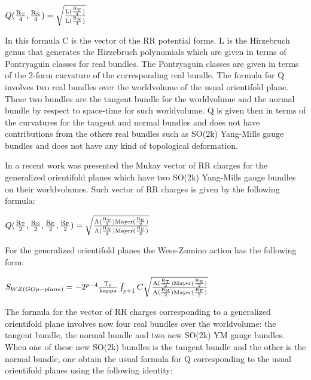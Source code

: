 \documentclass[a4paper,a4paper]{article}
\begin{document}
\begin{center}
{  $ Q(\frac{\rm R_T}{\rm 4},\frac{\rm R_N}{\rm 4}) =\sqrt{\frac{\rm L(\frac{\rm R_T}{\rm 4})}{\rm L(\frac{\rm R_N}{\rm 4})}}  $ }
\end{center}
In this formula C is the vector of the RR potential forms. L is the Hirzebruch genus that generates the Hirzebruch polynomials which are given in
terms of Pontryaguin classes for real bundles. The Pontryaguin classes are given in terms of the 2-form curvature of the corresponding real bundle. The
formula for Q involves two real bundles over the worldvolume of the usual orientifold plane.  These two bundles are the tangent bundle for the worldvolume and the normal bundle by respect to space-time for such worldvolume. Q is given then in terms of the curvatures for the tangent and
normal bundles and does not have contributions  from the others real bundles
such as SO(2k) Yang-Mills gauge bundles and does not have any kind of topological deformation.

In a recent work was presented the Mukay vector of RR charges for the generalized orientifold planes which have two SO(2k) Yang-Mills gauge bundles on their worldvolumes.  Such vector of RR charges is given by the following formula:

\begin{center}
{  $ Q(\frac{\rm R_T}{\rm 2},\frac{\rm R_N}{\rm 2},\frac{\rm R_E}{\rm 2},\frac{\rm R_F}{\rm 2}) =\sqrt{\frac{\rm A(\frac{\rm R_T}{\rm 2})Mayer(\frac{\rm R_E}{\rm 2})}{\rm A(\frac{\rm R_N}{\rm 2})Mayer(\frac{\rm R_F}{\rm 2})}} $ }
\end{center}

For the generalized  orientifold planes the Wess-Zumino action has the following form:

\begin{center}
{  $ S_{WZ(GOp-plane)} = -2^{p-4}\frac{\rm T_p}{\rm kappa}\int_{p+1} C\sqrt{\frac{\rm A(\frac{\rm R_T}{\rm 2})Mayer(\frac{\rm R_E}{\rm 2})}{\rm A(\frac{\rm R_N}{\rm 2})Mayer(\frac{\rm R_F}{\rm 2})}}$ }
\end{center}

The formula for the vector of RR charges corresponding to a generalized orientifold plane involves now four real bundles over the worldvolume: the 
tangent bundle, the normal bundle and two new SO(2k) YM gauge bundles.
When one of these new SO(2k) bundles is the tangent bundle and the other is the normal bundle, one obtain the usual formula for Q corresponding to the usual orientifold planes using the following identity:
\end{document}
